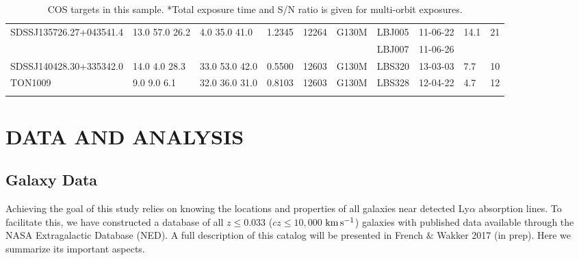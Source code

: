 \documentclass[twocolumn,tighten]{aastex6}
\begin{document}
\begin{table}[ht]
\begin{center}
\begin{tabular}{l l l l l l l l l l}
SDSSJ135726.27+043541.4 & 13.0  57.0  26.2 &    4.0  35.0  41.0  &    1.2345  & 12264      &   G130M  &   LBJ005  		& 11-06-22		   & 14.1  &      21         \\
				        	     & 	  	  	        &    		  	       &    	  	 & 	  	    &                &   LBJ007  			& 11-06-26		   &          &                   \\
SDSSJ140428.30+335342.0 & 14.0  4.0  28.3  &   33.0  53.0  42.0  &    0.5500  & 12603  	    &   G130M  &  LBS320   		& 13-03-03   		   &   7.7  &      10          \\
TON1009  			    &    9.0  9.0  6.1   &    32.0  36.0  31.0  &    0.8103  & 12603  	    &   G130M  &  LBS328   		& 12-04-22   		   &   4.7  &      12         \\

 \\
\hline

\end{tabular}
\end{center}
  \caption{\small{COS targets in this sample. *Total exposure time and S/N ratio is given for multi-orbit exposures.}}
  \label{target_table}
\end{table}


\section{DATA AND ANALYSIS}


\subsection{Galaxy Data}
Achieving the goal of this study relies on knowing the locations and properties of all galaxies near detected Ly$\alpha$ absorption lines. To facilitate this, we have constructed a database of all $z\leq 0.033$ ($cz\leq 10,000$ $\rm km\, s^{-1}$) galaxies with published data available through the NASA Extragalactic Database (NED). A full description of this catalog will be presented in French $\&$ Wakker 2017 (in prep). Here we summarize its important aspects. 
\end{document}
